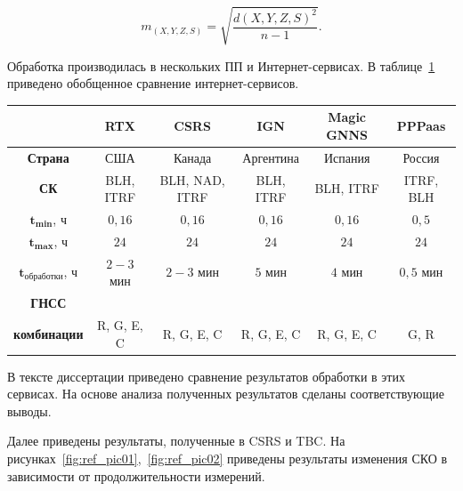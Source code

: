 \begin{equation}
	\label{eq:refeq03}
	m_{(X,Y,Z,S)}=\sqrt{\frac{d(X,Y,Z,S)^2}{n-1}}. 
\end{equation}


Обработка производилась в нескольких ПП и Интернет-сервисах. В таблице~\cref{tab:ref_tab_CompareGNSSsrv} приведено обобщенное сравнение интернет-сервисов.


\begin{table} [tbp]
	\label{tab:ref_tab_CompareGNSSsrv} %
	\centering\small
	\begin{threeparttable}%
		\setlength{\tabcolsep}{5pt}
		
		\begin{tabular}{cccccc}
			\toprule
			~									& RTX		& CSRS			& IGN		& Magic GNNS& PPPaas	\\ 
			\midrule
			\textbf{Страна}						& США		& Канада		& Аргентина	& Испания	& Россия	\\ 
			\textbf{СК}							& BLH, ITRF	& BLH, NAD, ITRF& BLH, ITRF	& BLH, ITRF	& ITRF, BLH	\\ 
			$\mathbf{t_{min}}$, ч				& $0,16$	& $0,16$		& $0,16$	& $0,16$	& $0,5$		\\ 
			$\mathbf{t_{max}}$, ч				& $24$		& $24$			& $24$		& $24$		& $24$		\\ 
			$\mathbf{t_{\text{обработки}}}$, ч	& $2-3$ мин	& $2-3$ мин		& $5$ мин	& $4$ мин	& $0,5$ мин	\\ 
			\textbf{ГНСС} \\
			\textbf{комбинации}					& R, G, E, C& R, G, E, C	& R, G, E, C& R, G, E, C& G, R		\\ 
			\bottomrule
		\end{tabular}
	\end{threeparttable}
	\vspace{1ex} %
\end{table}


В тексте диссертации приведено сравнение результатов обработки в этих сервисах. На основе анализа полученных результатов сделаны соответствующие выводы. 

 Далее приведены результаты, полученные в CSRS и TBC. На рисунках~\cref{fig:ref_pic01},~\cref{fig:ref_pic02} приведены результаты изменения СКО в зависимости от продолжительности измерений.


